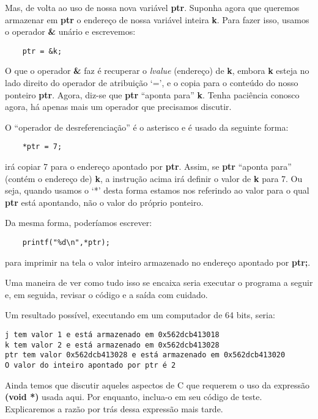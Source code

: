 Mas, de volta ao uso de nossa nova variável \textbf{ptr}. Suponha agora que queremos armazenar em \textbf{ptr} o endereço de nossa variável inteira \textbf{k}. Para fazer isso, usamos o operador \textbf{\&} unário e escrevemos:

\begin{lstlisting}
	ptr = &k;
\end{lstlisting}

O que o operador \textbf{\&} faz é recuperar o \textit{lvalue} (endereço) de \textbf{k}, embora \textbf{k} esteja no lado direito do operador de atribuição `=', e o copia para o conteúdo do nosso ponteiro \textbf{ptr}. Agora, diz-se que \textbf{ptr} ``aponta para'' \textbf{k}. Tenha paciência conosco agora, há apenas mais um operador que precisamos discutir.

O ``operador de desreferenciação'' é o asterisco e é usado da seguinte forma:

\begin{lstlisting}
	*ptr = 7;
\end{lstlisting}
irá copiar 7 para o endereço apontado por \textbf{ptr}. Assim, se \textbf{ptr} ``aponta para'' (contém o endereço de) \textbf{k}, a instrução acima irá definir o valor de \textbf{k} para 7. Ou seja, quando usamos o `*' desta forma estamos nos referindo ao valor para o qual \textbf{ptr} está apontando, não o valor do próprio ponteiro.

Da mesma forma, poderíamos escrever:
\begin{lstlisting}
	printf("%d\n",*ptr);
\end{lstlisting}
para imprimir na tela o valor inteiro armazenado no endereço apontado por \textbf{ptr;}.

Uma maneira de ver como tudo isso se encaixa seria executar o programa a seguir e, em seguida, revisar o código e a saída com cuidado.



Um resultado possível, executando em um computador de 64 bits, seria:
\lstconsolestyle
\begin{lstlisting}
j tem valor 1 e está armazenado em 0x562dcb413018
k tem valor 2 e está armazenado em 0x562dcb413028
ptr tem valor 0x562dcb413028 e está armazenado em 0x562dcb413020
O valor do inteiro apontado por ptr é 2
\end{lstlisting}
\lstcodestyle
\begin{remark}
	Ainda temos que discutir aqueles aspectos de C que requerem o uso da expressão \textbf{(void *)} usada aqui. Por enquanto, inclua-o em seu código de teste. Explicaremos a razão por trás dessa expressão mais tarde.

\end{remark}

